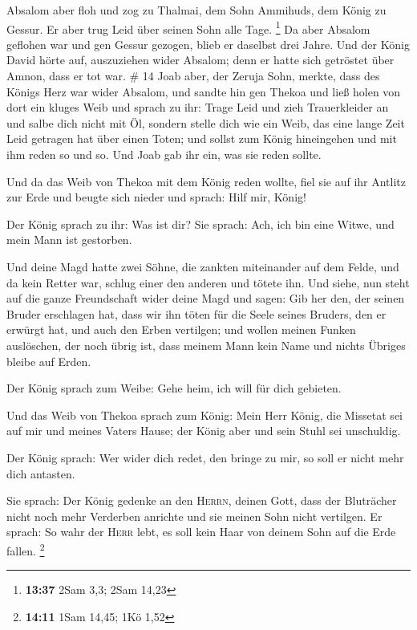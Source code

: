  Absalom aber floh und zog zu Thalmai, dem Sohn Ammihuds,
dem König zu Gessur. Er aber trug Leid über seinen Sohn alle Tage.
\footnote{\textbf{13:37} 2Sam 3,3; 2Sam 14,23}  Da aber
Absalom geflohen war und gen Gessur gezogen, blieb er daselbst drei
Jahre.  Und der König David hörte auf, auszuziehen wider
Absalom; denn er hatte sich getröstet über Amnon, dass er tot war. \# 14
 Joab aber, der Zeruja Sohn, merkte, dass des Königs Herz
war wider Absalom,  und sandte hin gen Thekoa und ließ
holen von dort ein kluges Weib und sprach zu ihr: Trage Leid und zieh
Trauerkleider an und salbe dich nicht mit Öl, sondern stelle dich wie
ein Weib, das eine lange Zeit Leid getragen hat über einen Toten;
 und sollst zum König hineingehen und mit ihm reden so und
so. Und Joab gab ihr ein, was sie reden sollte.

 Und da das Weib von Thekoa mit dem König reden wollte,
fiel sie auf ihr Antlitz zur Erde und beugte sich nieder und sprach:
Hilf mir, König!

 Der König sprach zu ihr: Was ist dir? Sie sprach: Ach,
ich bin eine Witwe, und mein Mann ist gestorben.

 Und deine Magd hatte zwei Söhne, die zankten miteinander
auf dem Felde, und da kein Retter war, schlug einer den anderen und
tötete ihn.  Und siehe, nun steht auf die ganze
Freundschaft wider deine Magd und sagen: Gib her den, der seinen Bruder
erschlagen hat, dass wir ihn töten für die Seele seines Bruders, den er
erwürgt hat, und auch den Erben vertilgen; und wollen meinen Funken
auslöschen, der noch übrig ist, dass meinem Mann kein Name und nichts
Übriges bleibe auf Erden.

 Der König sprach zum Weibe: Gehe heim, ich will für dich
gebieten.

 Und das Weib von Thekoa sprach zum König: Mein Herr
König, die Missetat sei auf mir und meines Vaters Hause; der König aber
und sein Stuhl sei unschuldig.

 Der König sprach: Wer wider dich redet, den bringe zu
mir, so soll er nicht mehr dich antasten.

 Sie sprach: Der König gedenke an den \textsc{Herrn},
deinen Gott, dass der Bluträcher nicht noch mehr Verderben anrichte und
sie meinen Sohn nicht vertilgen. Er sprach: So wahr der \textsc{Herr}
lebt, es soll kein Haar von deinem Sohn auf die Erde fallen. \footnote{\textbf{14:11}
  1Sam 14,45; 1Kö 1,52}

